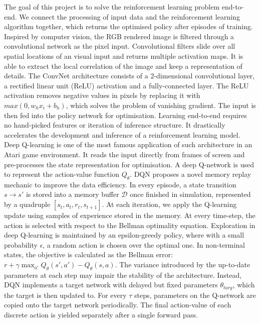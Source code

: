 \documentclass[oneside,11pt,a4paper]{article}
\begin{document}
The goal of this project is to solve the reinforcement learning problem end-to-end. We connect the processing of input data and the reinforcement learning algorithm together, which returns the optimised policy after episodes of training. Inspired by computer vision, the RGB rendered image is filtered through a convolutional network as the pixel input. Convolutional filters slide over all spatial locations of an visual input and returns multiple activation maps. It is able to extract the local correlation of the image and keep a representation of details. The ConvNet architecture consists of a 2-dimensional convolutional layer, a rectified linear unit (ReLU) activation and a fully-connected layer. The ReLU activation removes negative values in pixels by replacing it with $max(0, w_hx_i+b_h)$, which solves the problem of vanishing gradient. The input is then fed into the policy network for optimisation. Learning end-to-end requires no hand-picked features or iteration of inference structure. It drastically accelerates the development and inference of a reinforcement learning model.
\newline
\newline
\noindent
Deep Q-learning is one of the most famous application of such architecture in an Atari game environment. It reads the input directly from frames of screen and pre-processes the state representation for optimisation. A deep Q-network is used to represent the action-value function $Q_\theta$. DQN proposes a novel memory replay mechanic to improve the data efficiency. In every episode, a state transition $s\rightarrow s'$ is stored into a memory buffer $\mathcal D$ once finished in simulation, represented by a quadruple $[s_t,a_t,r_t,s_{t+1}]$. At each iteration, we apply the Q-learning update using samples of experience stored in the memory. At every time-step, the action is selected with respect to the Bellman optimality equation. Exploration in deep Q-learning is maintained by an epsilon-greedy policy, where with a small probability $\epsilon$, a random action is chosen over the optimal one. In non-terminal states, the objective is calculated as the Bellman error: $r+\gamma\max_{a'}Q_\theta(s',a')-Q_\theta(s,a)$. The variance introduced by the up-to-date parameters at each step may impair the stability of the architecture. Instead, DQN implements a target network with delayed but fixed parameters $\theta_{targ}$, which the target is then updated to. For every $\tau$ steps, parameters on the Q-network are copied onto the target network periodically. The final action-value of each discrete action is yielded separately after a single forward pass.
\newline
\newline
\noindent
\end{document}
